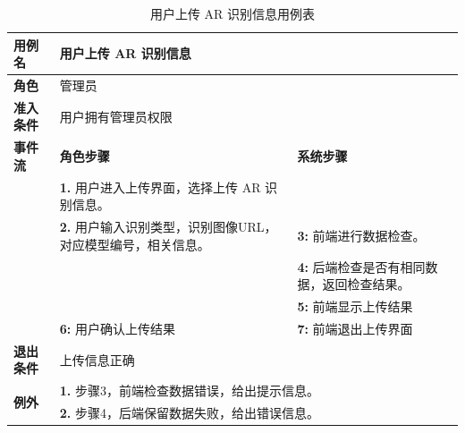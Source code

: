 \begin{table}[H]
  \centering
  \renewcommand\arraystretch{1.1}
  \small
  \caption{用户上传 AR 识别信息用例表}
  \setlength{\tabcolsep}{4mm}
  \begin{tabular}{|p{2cm}|p{5.75cm}|p{5.75cm}|}
    \hline \textbf{用例名} & \multicolumn{2}{l|}{用户上传 AR 识别信息} \\
    \hline \textbf{角色} & \multicolumn{2}{l|}{管理员} \\
    \hline \textbf{准入条件} & \multicolumn{2}{l|}{用户拥有管理员权限} \\
    \hline \textbf{事件流} & \textbf{角色步骤} & \textbf{系统步骤} \\
    \hline \multirow{3}{*}{~} & \textbf{1.} 用户进入上传界面，选择上传 AR 识别信息。  &    \\
    \cline{2-3} & \textbf{2.} 用户输入识别类型，识别图像URL，对应模型编号，相关信息。 & \textbf{3:} 前端进行数据检查。 \\
    \cline{2-3} &  & \textbf{4:} 后端检查是否有相同数据，返回检查结果。 \\
    \cline{2-3} &  & \textbf{5:} 前端显示上传结果 \\
    \cline{2-3} & \textbf{6:} 用户确认上传结果 & \textbf{7:} 前端退出上传界面 \\
    \hline \textbf{退出条件}  & \multicolumn{2}{l|}{上传信息正确} \\
    \hline \multirow{2}{*}{\textbf{例外}} & \multicolumn{2}{l|}{\textbf{1.} 步骤3，前端检查数据错误，给出提示信息。} \\
     & \multicolumn{2}{l|}{\textbf{2.} 步骤4，后端保留数据失败，给出错误信息。} \\
    \hline
  \end{tabular}
\end{table}

